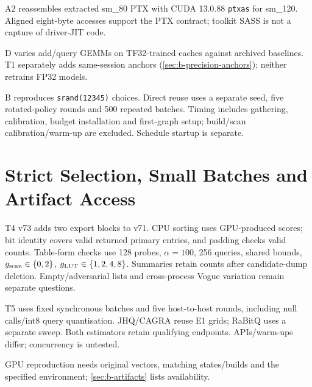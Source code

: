 A2 reassembles extracted sm\_80 PTX with CUDA 13.0.88 \texttt{ptxas} for sm\_120. Aligned eight-byte accesses support the PTX contract; toolkit SASS is not a capture of driver-JIT code.

D varies add/query GEMMs on TF32-trained caches against archived baselines. T1 separately adds same-session anchors (\cref{sec:b-precision-anchors}); neither retrains FP32 models.

B reproduces \texttt{srand(12345)} choices. Direct reuse uses a separate seed, five rotated-policy rounds and 500 repeated batches. Timing includes gathering, calibration, budget installation and first-graph setup; build/scan calibration/warm-up are excluded. Schedule startup is separate.

\section{Strict Selection, Small Batches and Artifact Access}
\label{sec:a-t4-t5}

T4 v73 adds two export blocks to v71. CPU sorting uses GPU-produced scores; bit identity covers valid returned primary entries, and padding checks valid counts. Table-form checks use 128 probes, $\alpha=100$, 256 queries, shared bounds, $g_{\mathrm{scan}}\in\{0,2\}$, $g_{\mathrm{LUT}}\in\{1,2,4,8\}$. Summaries retain counts after candidate-dump deletion. Empty/adversarial lists and cross-process Vogue variation remain separate questions.

T5 uses fixed synchronous batches and five host-to-host rounds, including null calls/int8 query quantisation. JHQ/CAGRA reuse E1 grids; RaBitQ uses a separate sweep. Both estimators retain qualifying endpoints. APIs/warm-ups differ; concurrency is untested.

GPU reproduction needs original vectors, matching states/builds and the specified environment; \cref{sec:b-artifacts} lists availability.